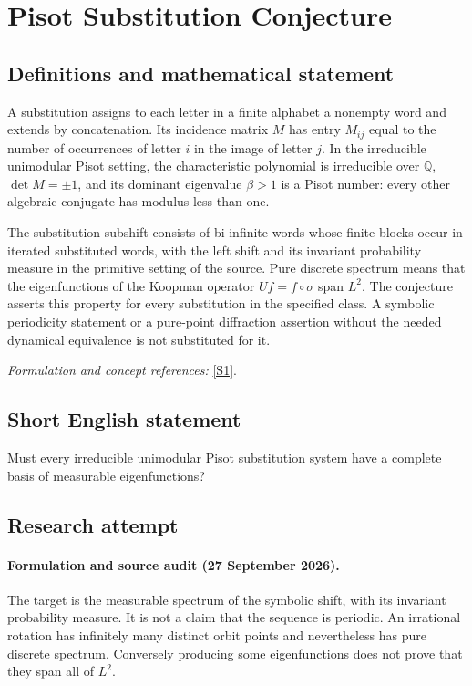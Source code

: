 \documentclass[11pt]{article}
\begin{document}
\section*{\texorpdfstring{Pisot Substitution Conjecture}{Pisot Substitution Conjecture}}\label{462}
\subsection{Definitions and mathematical statement}
A substitution assigns to each letter in a finite alphabet a nonempty word and extends by concatenation. Its incidence matrix $M$ has entry $M_{ij}$ equal to the number of occurrences of letter $i$ in the image of letter $j$. In the irreducible unimodular Pisot setting, the characteristic polynomial is irreducible over ${\mathbb{Q}}$, $\det M=\pm1$, and its dominant eigenvalue $\beta>1$ is a Pisot number: every other algebraic conjugate has modulus less than one.

The substitution subshift consists of bi-infinite words whose finite blocks occur in iterated substituted words, with the left shift and its invariant probability measure in the primitive setting of the source. Pure discrete spectrum means that the eigenfunctions of the Koopman operator $Uf=f\circ\sigma$ span $L^2$. The conjecture asserts this property for every substitution in the specified class. A symbolic periodicity statement or a pure-point diffraction assertion without the needed dynamical equivalence is not substituted for it.
\par\smallskip\textit{Formulation and concept references:} \href{https://ems.press/content/serial-article-files/32990?nt=1}{[S1]}.

\subsection{Short English statement}
Must every irreducible unimodular Pisot substitution system have a complete basis of measurable eigenfunctions?
\subsection{Research attempt}
\paragraph{Formulation and source audit (27 September 2026).}
The target is the measurable spectrum of the symbolic shift, with its
invariant probability measure. It is not a claim that the sequence is
periodic. An irrational rotation has infinitely many distinct orbit points
and nevertheless has pure discrete spectrum. Conversely producing some
eigenfunctions does not prove that they span all of $L^2$.
\end{document}
